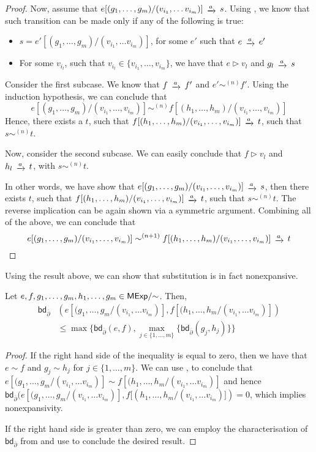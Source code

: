 \begin{proof}
		Now, assume that  $e[(g_1, \dots, g_m)/ (v_{i_1}, \dots v_{i_m})] \tr{a} s$. Using , we know that such transition can be made only if any of the following is true:
		\begin{itemize}
			\item $s = e'[(g_1, \dots, g_m)/ (v_{i_1}, \dots v_{i_m})]$, for some $e'$ such that $e \tr{a} e'$
			\item For some $v_{i_l}$, such that $v_{i_l} \in \{v_{i_1}, \dots, v_{i_m}\}$, we have that $e \rhd v_l$ and $g_l \tr{a} s$
		\end{itemize}
		Consider the first subcase. We know that $f \tr{a} f'$ and $e' \sim^{(n)} f'$. Using the induction hypothesis, we can conclude that 
		$$
			e[(g_1, \dots, g_m)/(v_{i_1}, \dots, v_{i_m})] \sim^{(n)} f[(h_1, \dots, h_m)/(v_{i_1}, \dots, v_{i_m})]
		$$
		Hence, there exists a $t$, such that $f[(h_1, \dots, h_m)/(v_{i_1}, \dots, v_{i_m})] \tr{a} t$, such that $s \sim^{(n)} t$.
		
		Now, consider the second subcase. We can easily conclude that $f \rhd v_l$ and $h_l \tr{a} t$, with $s \sim^{(n)} t$.
		
		In other words, we have show that $e[(g_1, \dots, g_m)/ (v_{i_1}, \dots, v_{i_m})] \tr{a} s$, then there exists $t$, such that $f[(h_1, \dots, h_m)/(v_{i_1}, \dots, v_{i_m})] \tr{a} t$, such that $s \sim^{(n)} t$. The reverse implication can be again shown via a symmetric argument. Combining all of the above, we can conclude that
		$$e[(g_1, \dots, g_m)/ (v_{i_1}, \dots, v_{i_m})] \sim^{(n+1)} f[(h_1, \dots, h_m)/(v_{i_1}, \dots, v_{i_m})] \tr{a} t\qedhere$$
\end{proof}
Using the result above, we can show that substitution is in fact nonexpansive.
\begin{corollary}\label{cor:seq_nexp}
	Let $e,f,g_1, \dots , g_m,h_1, \dots, g_m \in {\mathsf{MExp}}/{\sim}$. Then,
	\begin{align*}
		\mathsf{bd}_{\overline{\partial}}&\left(e[(g_1, \dots, g_m/(v_{i_1}, \dots v_{i_m})], f[(h_1, \dots, h_m/(v_{i_1}, \dots v_{i_m})]\right)\\& \leq \max\{\mathsf{bd}_{\overline{\partial}}(e,f),  \max_{j \in \{1, \dots, m\}} \{\mathsf{bd}_{\overline{\partial}}(g_j,h_j)\}\}
	\end{align*}

\end{corollary}
\begin{proof}
If the right hand side of the inequality is equal to zero, then we have that $e \sim f$ and $g_j \sim h_j$ for $j \in \{1, \dots, m\}$. We can use , to conclude that $e[(g_1, \dots, g_m/(v_{i_1}, \dots v_{i_m})] \sim f[(h_1, \dots, h_m/(v_{i_1}, \dots v_{i_m})]$ and hence $\mathsf{bd}_{\overline{\partial}}(e[(g_1, \dots, g_m/(v_{i_1}, \dots v_{i_m})], f[(h_1, \dots, h_m/(v_{i_1}, \dots v_{i_m})]) = 0$, which implies nonexpansivity.
	
If the right hand side is greater than zero, we can employ the characterisation of $\mathsf{bd}_{\overline{\partial}}$ from  and use  to conclude the desired result. 
\end{proof}
